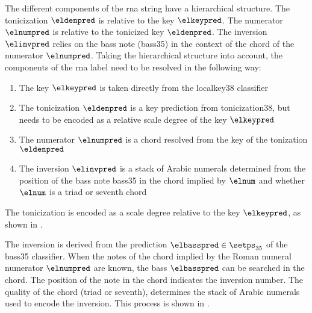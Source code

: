 
The different components of the \gls{rna} string have a
hierarchical structure. The tonicization $\eldenpred$ is
relative to the key $\elkeypred$. The numerator $\elnumpred$
is relative to the tonicized key $\eldenpred$. The inversion
$\elinvpred$ relies on the bass note (\gls{bass35}) in the
context of the chord of the numerator $\elnumpred$. Taking
the hierarchical structure into account, the components of
the \gls{rna} label need to be resolved in the following
way:

\begin{enumerate} 
    \item The key $\elkeypred$ is taken directly from the
    \gls{localkey38} classifier 
    \item The tonicization $\eldenpred$ is a key prediction
    from \gls{tonicization38}, but needs to be encoded as a
    relative scale degree of the key $\elkeypred$
    \item The numerator $\elnumpred$ is a chord resolved
    from the key of the tonization $\eldenpred$ 
    \item The inversion $\elinvpred$ is a stack of Arabic
    numerals determined from the position of the bass note
    \gls{bass35} in the chord implied by $\elnum$ and
    whether $\elnum$ is a triad or seventh chord
\end{enumerate}


The tonicization is encoded as a scale degree relative to
the key $\elkeypred$, as shown in
.



The inversion is derived from the prediction $\elbasspred
\in \setps_{35}$ of the \gls{bass35} classifier. When the
notes of the chord implied by the Roman numeral numerator
$\elnumpred$ are known, the bass $\elbasspred$ can be
searched in the chord. The position of the note in the chord
indicates the inversion number. The quality of the chord
(triad or seventh), determines the stack of Arabic numerals
used to encode the inversion. This process is shown in
.

